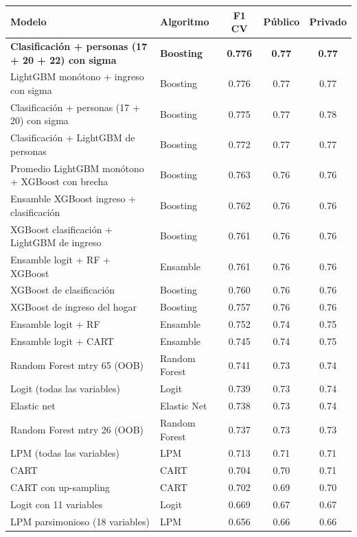 \begin{table}
\centering\begingroup\fontsize{7}{9}\selectfont

\begin{tabular}[t]{llccc}
\toprule
Modelo & Algoritmo & F1 CV & Público & Privado\\
\midrule
\textbf{Clasificación + personas (17 + 20 + 22) con sigma} & \textbf{Boosting} & \textbf{0.776} & \textbf{0.77} & \textbf{0.77}\\
LightGBM monótono + ingreso con sigma & Boosting & 0.776 & 0.77 & 0.77\\
Clasificación + personas (17 + 20) con sigma & Boosting & 0.775 & 0.77 & 0.78\\
Clasificación + LightGBM de personas & Boosting & 0.772 & 0.77 & 0.77\\
Promedio LightGBM monótono + XGBoost con brecha & Boosting & 0.763 & 0.76 & 0.76\\
Ensamble XGBoost ingreso + clasificación & Boosting & 0.762 & 0.76 & 0.76\\
XGBoost clasificación + LightGBM de ingreso & Boosting & 0.761 & 0.76 & 0.76\\
Ensamble logit + RF + XGBoost & Ensamble & 0.761 & 0.76 & 0.76\\
XGBoost de clasificación & Boosting & 0.760 & 0.76 & 0.76\\
XGBoost de ingreso del hogar & Boosting & 0.757 & 0.76 & 0.76\\
Ensamble logit + RF & Ensamble & 0.752 & 0.74 & 0.75\\
Ensamble logit + CART & Ensamble & 0.745 & 0.74 & 0.75\\
Random Forest mtry 65 (OOB) & Random Forest & 0.741 & 0.73 & 0.74\\
Logit (todas las variables) & Logit & 0.739 & 0.73 & 0.74\\
Elastic net & Elastic Net & 0.738 & 0.73 & 0.74\\
Random Forest mtry 26 (OOB) & Random Forest & 0.737 & 0.73 & 0.73\\
LPM (todas las variables) & LPM & 0.713 & 0.71 & 0.71\\
CART & CART & 0.704 & 0.70 & 0.71\\
CART con up-sampling & CART & 0.702 & 0.69 & 0.70\\
Logit con 11 variables & Logit & 0.669 & 0.67 & 0.67\\
LPM parsimonioso (18 variables) & LPM & 0.656 & 0.66 & 0.66\\
\bottomrule
\end{tabular}
\endgroup{}
\end{table}
